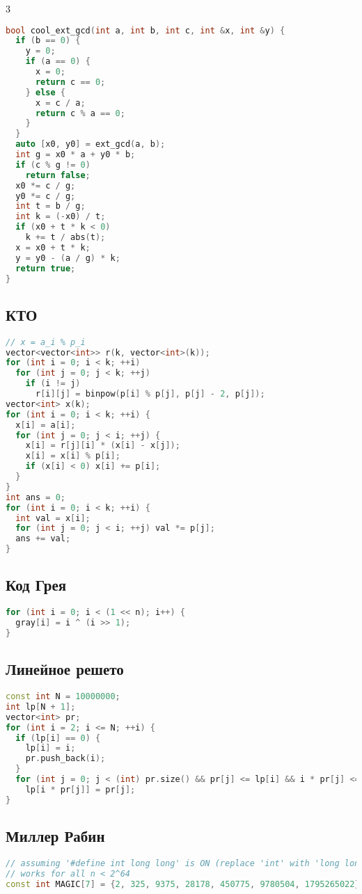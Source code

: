 \documentclass[10pt,a4paper,landscape,twosided]{extarticle}
\begin{document}
\begin{multicols*}{3}
\begin{lstlisting}[language=C++]
bool cool_ext_gcd(int a, int b, int c, int &x, int &y) {
  if (b == 0) {
    y = 0;
    if (a == 0) {
      x = 0;
      return c == 0;
    } else {
      x = c / a;
      return c % a == 0;
    }
  }
  auto [x0, y0] = ext_gcd(a, b);
  int g = x0 * a + y0 * b;
  if (c % g != 0)
    return false;
  x0 *= c / g;
  y0 *= c / g;
  int t = b / g;
  int k = (-x0) / t;
  if (x0 + t * k < 0)
    k += t / abs(t);
  x = x0 + t * k;
  y = y0 - (a / g) * k;
  return true;
}
\end{lstlisting}

\subsection{КТО}
\begin{lstlisting}[language=C++]
// x = a_i % p_i
vector<vector<int>> r(k, vector<int>(k));
for (int i = 0; i < k; ++i)
  for (int j = 0; j < k; ++j)
    if (i != j)
      r[i][j] = binpow(p[i] % p[j], p[j] - 2, p[j]);
vector<int> x(k);
for (int i = 0; i < k; ++i) {
  x[i] = a[i];
  for (int j = 0; j < i; ++j) {
    x[i] = r[j][i] * (x[i] - x[j]);
    x[i] = x[i] % p[i];
    if (x[i] < 0) x[i] += p[i];
  }
}
int ans = 0;
for (int i = 0; i < k; ++i) {
  int val = x[i];
  for (int j = 0; j < i; ++j) val *= p[j];
  ans += val;
}
\end{lstlisting}

\subsection{Код Грея}
\begin{lstlisting}[language=C++]
for (int i = 0; i < (1 << n); i++) {
  gray[i] = i ^ (i >> 1);
}
\end{lstlisting}

\subsection{Линейное решето}
\begin{lstlisting}[language=C++]
const int N = 10000000;
int lp[N + 1];
vector<int> pr;
for (int i = 2; i <= N; ++i) {
  if (lp[i] == 0) {
    lp[i] = i;
    pr.push_back(i);
  }
  for (int j = 0; j < (int) pr.size() && pr[j] <= lp[i] && i * pr[j] <= N; ++j)
    lp[i * pr[j]] = pr[j];
}
\end{lstlisting}

\subsection{Миллер Рабин}
\begin{lstlisting}[language=C++]
// assuming '#define int long long' is ON (replace 'int' with 'long long' if not)
// works for all n < 2^64
const int MAGIC[7] = {2, 325, 9375, 28178, 450775, 9780504, 1795265022};


\end{lstlisting}
\end{multicols*}
\end{document}

